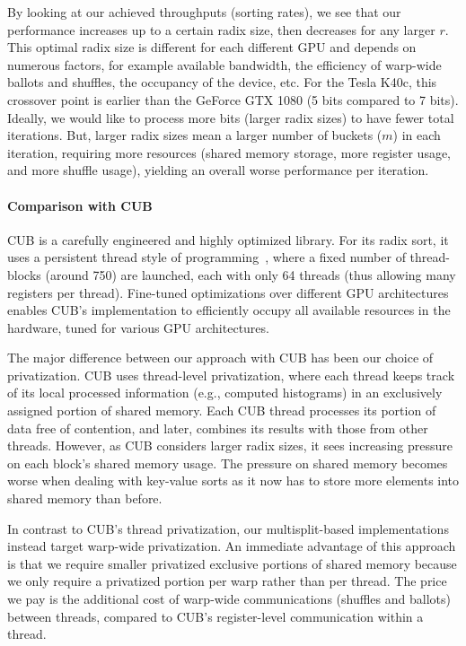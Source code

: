 

By looking at our achieved throughputs (sorting rates), we see that our performance increases up to a certain radix size, then decreases for any larger $r$. This optimal radix size is different for each different GPU and depends on numerous factors, for example available bandwidth, the efficiency of warp-wide ballots and shuffles, the occupancy of the device, etc.
For the Tesla K40c, this crossover point is earlier than the GeForce GTX 1080 (5 bits compared to 7 bits).
Ideally, we would like to process more bits (larger radix sizes) to have fewer total iterations. But, larger radix sizes mean a larger number of buckets ($m$) in each iteration, requiring more resources (shared memory storage, more register usage, and more shuffle usage), yielding an overall worse performance per iteration.

\paragraph{Comparison with CUB}
CUB is a carefully engineered and highly optimized library. For its radix sort, it uses a persistent thread style of programming~\cite{Gupta:2012:ASO}, where a fixed number of thread-blocks (around 750) are launched, each with only 64 threads (thus allowing many registers per thread).
Fine-tuned optimizations over different GPU architectures enables CUB's implementation to efficiently occupy all available resources in the hardware, tuned for various GPU architectures.

The major difference between our approach with CUB has been our choice of privatization. CUB uses thread-level privatization, where each thread keeps track of its local processed information (e.g., computed histograms) in an exclusively assigned portion of shared memory. Each CUB thread processes its portion of data free of contention, and later, combines its results with those from other threads.
However, as CUB considers larger radix sizes, it sees increasing pressure on each block's shared memory usage. The pressure on shared memory becomes worse when dealing with key-value sorts as it now has to store more elements into shared memory than before.

In contrast to CUB's thread privatization, our multisplit-based implementations instead target warp-wide privatization. An immediate advantage of this approach is that we require smaller privatized exclusive portions of shared memory because we only require a privatized portion per warp rather than per thread.
The price we pay is the additional cost of warp-wide communications (shuffles and ballots) between threads, compared to CUB's register-level communication within a thread.

